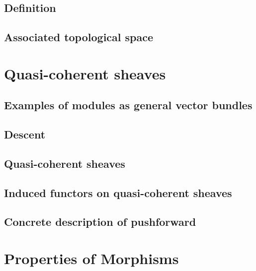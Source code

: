 \documentclass{article}
\begin{document}
  \subsection{Definition}
  \subsection{Associated topological space}

\section{Quasi-coherent sheaves}
  \subsection{Examples of modules as general vector bundles}
    
  \subsection{Descent}
  \subsection{Quasi-coherent sheaves}
    
  \subsection{Induced functors on quasi-coherent sheaves}
    
  \subsection{Concrete description of pushforward}
    

\section{Properties of Morphisms}
\end{document}
